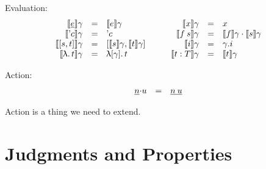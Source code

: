 \documentclass{article}
\begin{document}
\newcommand{\ev}[1]{\llbracket #1 \rrbracket}
Evaluation:
\[
\begin{array}[t]{rcl}
\ev {\neu e} \gamma & = & \ev e \gamma \\
\ev {\quo c} \gamma & = & \quo c \\
\ev {[s, t]} \gamma & = & [\ev s \gamma, \ev t \gamma] \\
\ev {\lam {} t} \gamma & = & \lam{[\gamma]} t \\
\end{array}
\qquad
\begin{array}[t]{rcl}
\ev x \gamma & = & x \\
\ev {f\:s} \gamma & = & \ev f \gamma \cdot \ev s \gamma \\
\ev i \gamma & = & \gamma.i \\
\ev {t : T} \gamma & = & \ev t \gamma\\
\end{array}
\]

Action:
\[\begin{array}{r@{\cdot}lcl}
\neu n & u & = & \neu {n\:u}
\end{array}\]

Action is a thing we need to extend.


\section{Judgments and Properties}

\newcommand{\herald}{-\!\!:}
\newcommand{\lay}[2]{\begin{array}[t]{@{}l@{}}#1\;\herald\\ %
  \quad\begin{array}[t]{@{}l@{}}#2\end{array}\end{array}}

\newcommand{\type}{\textsc{type}\;}
\newcommand{\judgment}{\textsc{judgment}\;}
\newcommand{\pve}{\mbox{$+$}}
\newcommand{\nve}{\mbox{$+$}}
\end{document}
